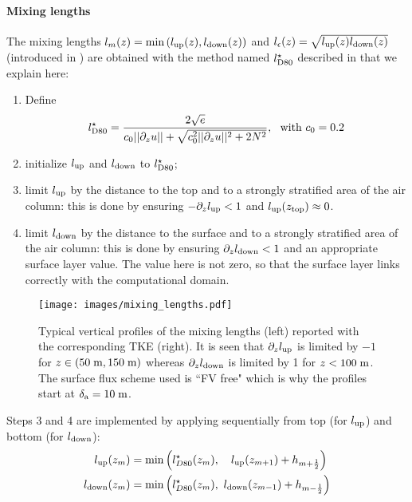 \paragraph{Mixing lengths}
The mixing lengths $l_m(z) = \min{(l_{\rm up}(z), l_{\rm down}(z))}$
and $l_\epsilon(z) = \sqrt{l_{\rm up}(z) l_{\rm down}(z)}$
(introduced in \citep{bougeault_parameterization_1989})
are obtained with the method named $l^\star_{\rm D80}$ described in
\cite{lemarie_simplified_2021} that we explain here:
\begin{enumerate}
	\item Define
		\begin{equation}
			\label{eq:ND_StratifiedCase_lD80}
			l^\star_{\rm D80} = \frac{2\sqrt{e}}
			{c_0 ||\partial_z u|| + \sqrt{
				c_0^2 ||\partial_z u||^2 + 2 N^2
			}}, ~~ \text{with } c_0=0.2
		\end{equation}
	\item initialize $l_{\rm up}$ and $l_{\rm down}$ to
		$l^\star_{\rm D80}$;
	\item limit $l_{\rm up}$ by the distance to the top and to
		a strongly stratified area of the air column:
		this is done by ensuring $-\partial_z l_{\rm up} < 1$
		and $l_{\rm up}(z_{\rm top}) \approx 0$.
	\item limit $l_{\rm down}$ by the distance to the surface
		and to a strongly stratified area of the air column:
		this is done by ensuring $\partial_z l_{\rm down} < 1$
		and an appropriate surface layer value.
		The value here is not zero, so that the surface layer
		links correctly with the computational domain.
\end{enumerate}
\begin{figure}
	\centering
	\texttt{[image: images/mixing\_lengths.pdf]}
	\caption{Typical vertical profiles of the mixing lengths
	(left) reported with the corresponding TKE (right).
	It is seen that $\partial_z l_{\rm up}$ is limited by $-1$
	for $z\in (50 \; {\rm m}, 150\; {\rm m})$ whereas
	$\partial_z l_{\rm down}$ is limited by 1 for $z<100 \;{\rm m}$.
	The surface flux scheme used is ``FV free" which is why the
	profiles start at $\delta_{\rm a} = 10\;{\rm m}$.}
	\label{fig:ND_StratifiedCase_mixing_lengths}
\end{figure}
Steps 3 and 4 are implemented by applying sequentially from top
(for $l_{\rm up}$) and bottom (for $l_{\rm down}$):
\begin{equation}
	\begin{aligned}
		l_{\rm up}(z_m) &= \min\left(l^\star_{D80}(z_m),~~~
		l_{\rm up}(z_{m+1}) + h_{m+\frac{1}{2}}\right) \\
		l_{\rm down}(z_m) &= \min\left(l^\star_{D80}(z_m),~
		l_{\rm down}(z_{m-1}) + h_{m-\frac{1}{2}}\right)
	\end{aligned}
\end{equation}

